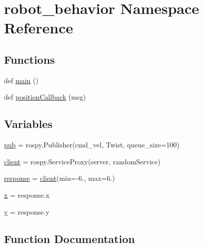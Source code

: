 \hypertarget{namespacerobot__behavior}{}\section{robot\+\_\+behavior Namespace Reference}
\label{namespacerobot__behavior}
\subsection*{Functions}
\begin{DoxyCompactItemize}
\item 
def \hyperlink{namespacerobot__behavior_a9aef922e5f68d8d4239416f1c17cdd1e}{main} ()
\item 
def \hyperlink{namespacerobot__behavior_a389417033272fd0abc7b55b57cf8aa06}{position\+Callback} (msg)
\end{DoxyCompactItemize}
\subsection*{Variables}
\begin{DoxyCompactItemize}
\item 
\hyperlink{namespacerobot__behavior_afec75724c8502be2b13af611548e8ed5}{pub} = rospy.\+Publisher(\textquotesingle{}cmd\+\_\+vel\textquotesingle{}, Twist, queue\+\_\+size=100)
\item 
\hyperlink{namespacerobot__behavior_afe11a3139022cf72f927c89b3b7c8364}{client} = rospy.\+Service\+Proxy(\textquotesingle{}server\textquotesingle{}, random\+Service)
\item 
\hyperlink{namespacerobot__behavior_ad24b97ca826242e79a54d1ce7324de27}{response} = \hyperlink{namespacerobot__behavior_afe11a3139022cf72f927c89b3b7c8364}{client}(min=-\/6., max=6.)
\item 
\hyperlink{namespacerobot__behavior_ab7c31583eff517c7c9ebcd4e2d498d8b}{x} = response.\+x
\item 
\hyperlink{namespacerobot__behavior_aa41f1e9f708b4470e60d2bffdd1d7433}{y} = response.\+y
\end{DoxyCompactItemize}


\subsection{Function Documentation}
\mbox{\label{namespacerobot__behavior_a9aef922e5f68d8d4239416f1c17cdd1e}} 
